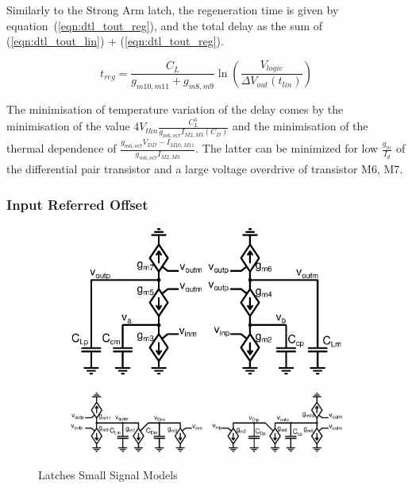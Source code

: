 Similarly to the Strong Arm latch, the regeneration time is given by equation~(\ref{eqn:dtl_tout_reg}), and the total delay as the sum of (\ref{eqn:dtl_tout_lin}) + (\ref{eqn:dtl_tout_reg}).

\begin{equation}
\label{eqn:dtl_tout_reg}
t_{reg} = \frac{C_{L}}{g_{m10,m11}+g_{m8,m9}} \ln{\left(\frac{V_{logic}}{\Delta V_{out}(t_{lin})}\right)}
\end{equation}

The minimisation of temperature variation of the delay comes by the minimisation of the value \(4V_{thn}\frac{C_L^3}{g_{m6,m7}I_{M2,M3}(C_{D})}\) and the minimisation of the thermal dependence of \(\frac{g_{m6,m7}V_{DD}-I_{M10,M11}}{g_{m6,m7}I_{M2,M3}}\). The latter can be minimized for low \(\frac{g_m}{I_d}\) of the differential pair transistor and a large voltage overdrive of transistor M6, M7.

\subsubsection{Input Referred Offset}
\begin{figure}[htp]
    \centering
    \begin{subfigure}[b]{0.44\textwidth}
        \centering
        \includegraphics[width=\textwidth]{Chapter7/Figs/sa_small_signal_model.ps}
        \label{fig:sa_small_signal}
    \end{subfigure}
    \begin{subfigure}[b]{0.54\textwidth}
        \centering
        \includegraphics[width=\textwidth]{Chapter7/Figs/dtl_small_signal_model.ps}
        \label{fig:dt_small_signal}
    \end{subfigure}
    \caption{Latches Small Signal Models}
    \label{fig:latches_small_signal}
\end{figure}

